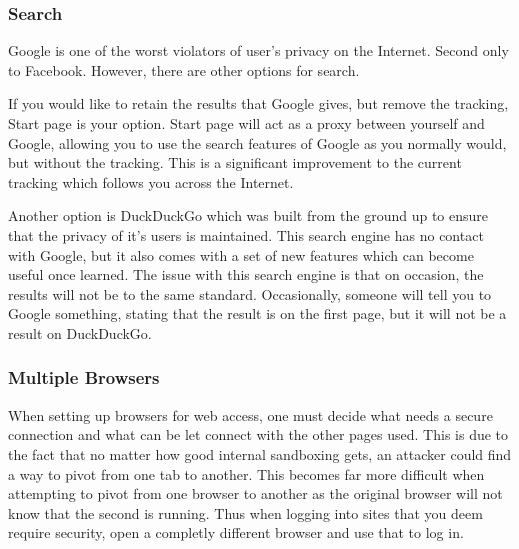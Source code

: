 \documentclass[a4paper,11pt]{report}
\begin{document}
		\subsubsection{Search}
			Google is one of the worst violators of user's privacy on the Internet. Second only to Facebook. 
			However, there are other options for search. \par 
			If you would like to retain the results that Google gives, but remove the tracking, Start page is your option. 
			Start page will act as a proxy between yourself and Google, allowing you to use the search features of Google as you normally would, but without the tracking. 
			This is a significant improvement to the current tracking which follows you across the Internet. \par 
			Another option is DuckDuckGo which was built from the ground up to ensure that the privacy of it's users is maintained. 
			This search engine has no contact with Google, but it also comes with a set of new features which can become useful once learned. 
			The issue with this search engine is that on occasion, the results will not be to the same standard. 
			Occasionally, someone will tell you to Google something, stating that the result is on the first page, but it will not be a result on DuckDuckGo. 
		\subsubsection{Multiple Browsers}
			When setting up browsers for web access, one must decide what needs a secure connection and what can be let connect with the other pages used. 
			This is due to the fact that no matter how good internal sandboxing gets, an attacker could find a way to pivot from one tab to another. 
			This becomes far more difficult when attempting to pivot from one browser to another as the original browser will not know that the second is running. 
			Thus when logging into sites that you deem require security, open a completly different browser and use that to log in. 
\end{document}
